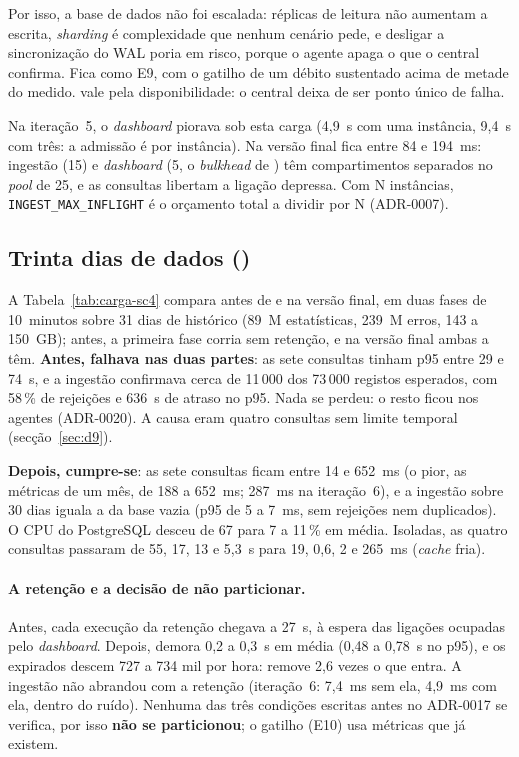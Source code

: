 Por isso, a base de dados não foi escalada: réplicas de leitura não aumentam a escrita, \emph{sharding} é
complexidade que nenhum cenário pede, e desligar a sincronização do WAL poria  em risco, porque o agente
apaga o que o central confirma. Fica como E9, com o gatilho de um débito sustentado acima de metade do medido.
 vale pela disponibilidade: o central deixa de ser ponto único de falha.

Na iteração~5, o \emph{dashboard} piorava sob esta carga (4,9~s com uma instância, 9,4~s com três: a admissão é
por instância). Na versão final fica entre 84 e 194~ms: ingestão (15) e \emph{dashboard} (5, o \emph{bulkhead} de
) têm compartimentos separados no \emph{pool} de 25, e as consultas libertam a ligação depressa. Com N
instâncias, \texttt{INGEST\_MAX\_INFLIGHT} é o orçamento total a dividir por N (ADR-0007).

\subsection{Trinta dias de dados ()}
\label{sec:sc4}


A Tabela~\ref{tab:carga-sc4} compara  antes de  e na versão final, em duas fases de 10~minutos
sobre 31 dias de histórico (89~M estatísticas, 239~M erros, 143 a 150~GB); antes, a primeira fase corria sem
retenção, e na versão final ambas a têm. \textbf{Antes,  falhava nas duas partes}: as sete consultas tinham
p95 entre 29 e 74~s, e a ingestão confirmava cerca de 11\,000 dos 73\,000 registos esperados, com 58\,\% de
rejeições e 636~s de atraso no p95. Nada se perdeu: o resto ficou nos agentes (ADR-0020). A causa eram quatro
consultas sem limite temporal (secção~\ref{sec:d9}).

\textbf{Depois, cumpre-se}: as sete consultas ficam entre 14 e 652~ms (o pior, as métricas de um mês, de 188 a 652~ms;
287~ms na iteração~6), e a ingestão sobre 30 dias iguala a da base vazia (p95 de 5 a 7~ms, sem rejeições nem duplicados). O CPU do
PostgreSQL desceu de 67 para 7 a 11\,\% em média. Isoladas, as quatro consultas passaram de 55, 17, 13 e 5,3~s para 19,
0,6, 2 e 265~ms (\emph{cache} fria).

\paragraph{A retenção e a decisão de não particionar.}
Antes, cada execução da retenção chegava a 27~s, à espera das ligações ocupadas pelo \emph{dashboard}. Depois,
demora 0,2 a 0,3~s em média (0,48 a 0,78~s no p95), e os expirados descem 727 a 734 mil por hora: remove 2,6 vezes o
que entra. A ingestão não abrandou com a retenção (iteração~6: 7,4~ms sem ela, 4,9~ms com ela, dentro do ruído).
Nenhuma das três condições escritas antes no ADR-0017 se verifica, por isso \textbf{não se particionou}; o gatilho
(E10) usa métricas que já existem.

